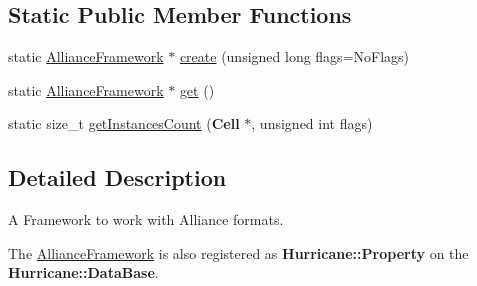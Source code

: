 \subsection*{Static Public Member Functions}
\begin{DoxyCompactItemize}
\item 
static \hyperlink{classCRL_1_1AllianceFramework}{Alliance\-Framework} $\ast$ \hyperlink{classCRL_1_1AllianceFramework_a8cff32ced8cc163cadca885d8ed8a5fc}{create} (unsigned long flags=No\-Flags)
\item 
static \hyperlink{classCRL_1_1AllianceFramework}{Alliance\-Framework} $\ast$ \hyperlink{classCRL_1_1AllianceFramework_a976479af696a86c998c10d9d2604839d}{get} ()
\item 
static size\-\_\-t \hyperlink{classCRL_1_1AllianceFramework_a95aa8c6b8ab3f995daf22a0317324933}{get\-Instances\-Count} ({\bf Cell} $\ast$, unsigned int flags)
\end{DoxyCompactItemize}


\subsection{Detailed Description}
A Framework to work with Alliance formats. 

The \hyperlink{classCRL_1_1AllianceFramework}{Alliance\-Framework} is also registered as {\bf Hurricane\-::\-Property} on the {\bf Hurricane\-::\-Data\-Base}. 

